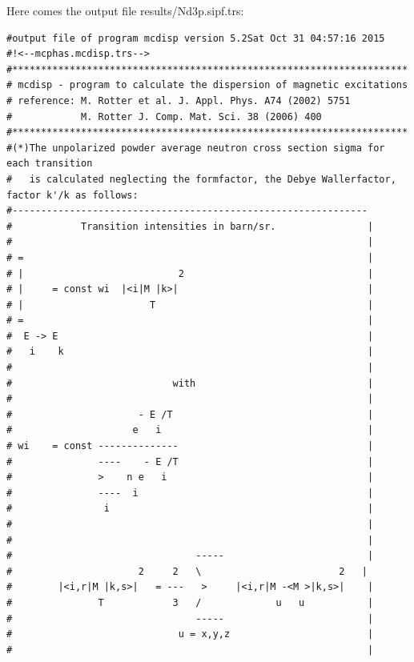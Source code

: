 \begin{enumerate}
Here comes the output file {\prg results/Nd3p.sipf.trs}:
{\footnotesize
\begin{verbatim}
#output file of program mcdisp version 5.2Sat Oct 31 04:57:16 2015
#!<--mcphas.mcdisp.trs-->
#*********************************************************************
# mcdisp - program to calculate the dispersion of magnetic excitations
# reference: M. Rotter et al. J. Appl. Phys. A74 (2002) 5751
#            M. Rotter J. Comp. Mat. Sci. 38 (2006) 400
#*********************************************************************
#(*)The unpolarized powder average neutron cross section sigma for each transition 
#   is calculated neglecting the formfactor, the Debye Wallerfactor, factor k'/k as follows:
#-------------------------------------------------------------- 
#            Transition intensities in barn/sr.                |
#                                                              |
# =                                                            |
# |                           2                                |
# |     = const wi  |<i|M |k>|                                 |
# |                      T                                     |
# =                                                            |
#  E -> E                                                      |
#   i    k                                                     |
#                                                              |
#                            with                              |
#                                                              |
#                      - E /T                                  |
#                     e   i                                    |
# wi    = const --------------                                 |
#               ----    - E /T                                 |
#               >    n e   i                                   |
#               ----  i                                        |
#                i                                             |
#                                                              |
#                                                              |
#                                -----                         |
#                      2     2   \                        2   |
#        |<i,r|M |k,s>|   = ---   >     |<i,r|M -<M >|k,s>|    |
#               T            3   /             u   u           |
#                                -----                         |
#                             u = x,y,z                        |
#                                                              |

\end{verbatim}}
\end{enumerate}
